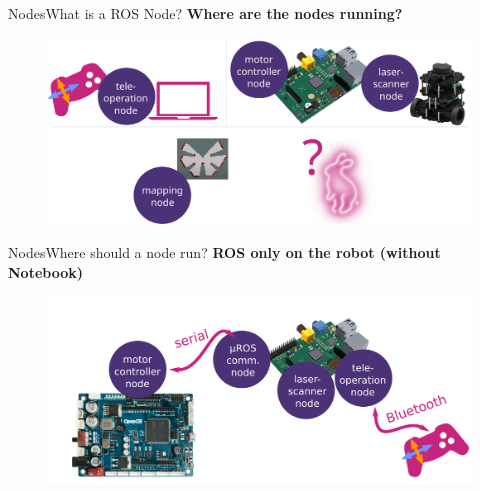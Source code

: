 \documentclass[aspectratio=169]{beamer}
\begin{document}
  \begin{frame}{Nodes}{What is a ROS Node?}
    \textbf{Where are the nodes running?}\\
      \begin{figure}[tbh!]
        \centering
        \includegraphics[width=.9\textwidth]{./figures/where_should_a_node_run.pdf}
      \end{figure}
  \end{frame}

\begin{frame}[plain]{Nodes}{Where should a node run?}
    \textbf{ROS only on the robot (without Notebook)}
      \begin{figure}[tbh!]
        \centering
        \includegraphics[width=.9\textwidth]{./figures/ros_nodes_on_robots.pdf}
      \end{figure}
  \end{frame}
  
\end{document}

